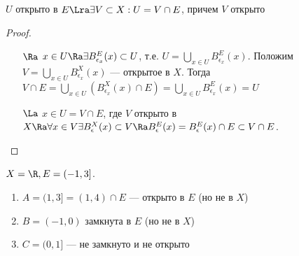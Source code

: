 \begin{lemma}
    \(U\) открыто в \(E \Lra \exists V \subset X: U = V \cap E\), причем \(V\) открыто
\end{lemma}
\begin{proof}\indent
    \begin{enumerate}
        \item[\(\Ra\)] \(x \in U \Ra \exists B_{\epsilon_x}^E(x) \subset U\), т.е. \(U = \bigcup_{x \in U}B_{\epsilon_x}^E(x)\). Положим \(V = \bigcup_{x \in U}B_{\epsilon_x}^X(x)\) --- открытое в \(X\). Тогда \(V \cap E = \bigcup_{x \in U}(B_{\epsilon_x}^X(x)\cap E) = \bigcup_{x \in U}B_{\epsilon_x}^E(x) = U\)
        \item[\(\La\)] \(x \in U = V \cap E\), где \(V\) открыто в \(X \Ra \forall x \in V \exists B_\epsilon^X(x) \subset V \Ra B_\epsilon^E(x) = B_\epsilon^E(x) \cap E \subset V \cap E\).
    \end{enumerate}    
\end{proof}

\begin{example}
    \(X = \R, E = (-1, 3]\).
    \begin{enumerate}
        \item \(A = (1, 3] = (1, 4) \cap E\) --- открыто в \(E\) (но не в \(X\))
        \item \(B = (-1, 0)\) замкнута в \(E\) (но не в \(X\))
        \item \(C = (0, 1]\) --- не замкнуто и не открыто
    \end{enumerate}
\end{example}